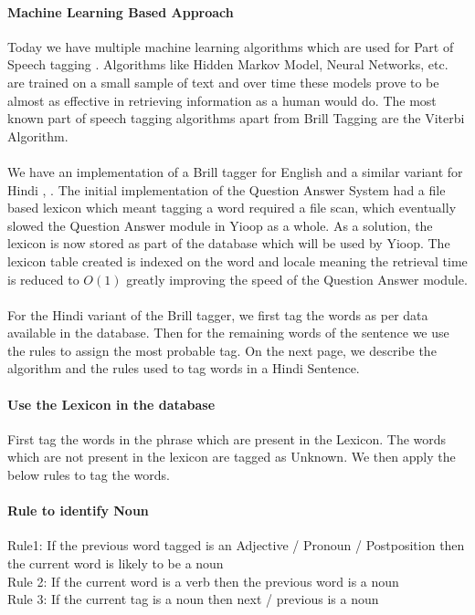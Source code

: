 \paragraph{Machine Learning Based Approach}
Today we have multiple machine learning algorithms which are used for Part of Speech tagging  \cite {brill1999unsupervised}. Algorithms like Hidden Markov Model, Neural Networks, etc. are trained on a small sample of text and over time these models prove to be almost as effective in retrieving information as a human would do. The most known part of speech tagging algorithms apart from Brill Tagging are the Viterbi Algorithm.

\paragraph{}
We have an implementation of a Brill tagger for English and a similar variant for Hindi \cite {garg2012rule}, \cite {dalal2006hindi}.  The initial implementation of the Question Answer System had a file based lexicon which meant tagging a word required a file scan, which eventually  slowed the Question Answer module in Yioop as a whole. As a solution, the lexicon is now stored as part of the database which will be used by Yioop. The lexicon table created is indexed on the word and locale meaning the retrieval time is reduced to $O(1)$ greatly improving the speed of the Question Answer module. 

\paragraph{}
For the Hindi variant of the Brill tagger, we first tag the words as per data available in the database. Then for the remaining words of the sentence we use the rules to assign the most probable tag. On the next page, we describe the algorithm and the rules used to tag words in a Hindi Sentence.  \\

\break
\paragraph{Use the Lexicon in the database}
First tag the words in the phrase which are present in the Lexicon. The words which are not present in the lexicon are tagged as Unknown. We then apply the below rules to tag the words.

\paragraph{Rule to identify Noun}
Rule1: If the previous word tagged is an Adjective / Pronoun / Postposition then the current word is likely to be a noun \\	
Rule 2: If the current word is a verb then the previous word is a noun \\
Rule 3: If the current tag is a noun then next / previous is a noun
		
